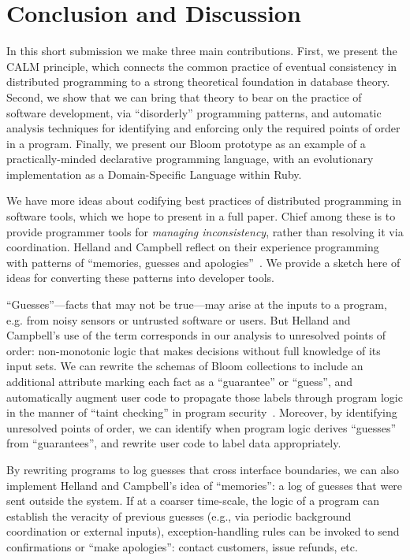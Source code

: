 \section{Conclusion and Discussion}
\label{sec:conclusion}
In this short submission we make three main contributions.  First, we present the CALM principle, which connects the common practice of eventual consistency in distributed programming to a strong theoretical foundation in database theory.  Second, we show that we can bring that theory to bear on the practice of software development, via ``disorderly'' programming patterns, and automatic analysis techniques for  identifying and enforcing only the required points of order in a program. Finally, we present our Bloom prototype as an example of a practically-minded declarative programming language, with an evolutionary implementation as a Domain-Specific Language within Ruby.

We have more ideas about codifying best practices of distributed programming in software tools, which we hope to present in a full paper.  Chief among these is to provide programmer tools for \emph{managing inconsistency}, rather than resolving it via coordination.  Helland and Campbell reflect on their experience programming with patterns of ``memories, guesses and apologies''~\cite{quicksand}.  We provide a sketch here of ideas for converting these patterns into developer tools.

``Guesses''---facts that may not be true---may arise at the inputs to a program, e.g. from noisy sensors or untrusted software or users.  But Helland and Campbell's use of the term corresponds in our analysis to unresolved points of order: non-monotonic logic that makes decisions without full knowledge of its input sets.  We can rewrite the schemas of Bloom collections to include an additional attribute marking each fact as a ``guarantee'' or ``guess'', and automatically augment user code to propagate those labels through program logic in the manner of ``taint checking'' in program security~\cite{taint,asbestos}.  Moreover, by identifying unresolved points of order, we can identify when program logic derives ``guesses'' from ``guarantees'', and rewrite user code to label data appropriately.

By rewriting programs to log guesses that cross interface boundaries, we can also implement Helland and Campbell's idea of ``memories'': a log of guesses that were sent outside the system.  If at a coarser time-scale, the logic of a program can establish the veracity of previous guesses (e.g., via periodic background coordination or external inputs), exception-handling rules can be invoked to send confirmations or ``make apologies'': contact customers, issue refunds, etc.

